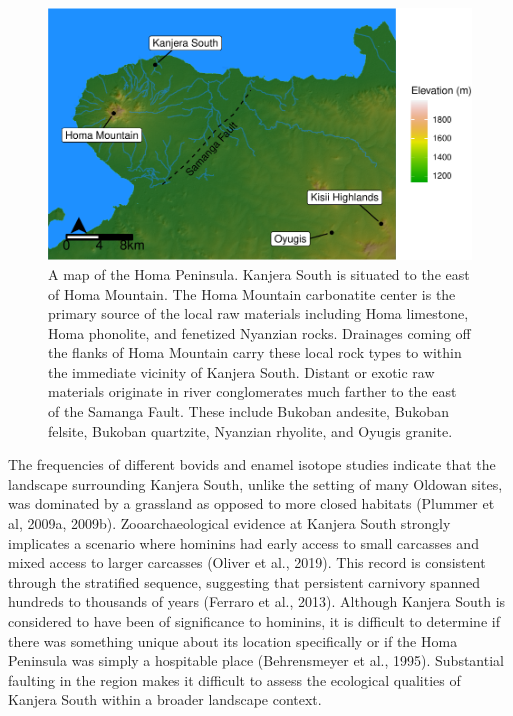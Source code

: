 \documentclass[]{elsarticle} %
\begin{document}
\begin{figure}
\centering
\includegraphics{Kanjera_South_Manuscript_files/figure-latex/fig-1-1.pdf}
\caption{A map of the Homa Peninsula. Kanjera South is situated to the
east of Homa Mountain. The Homa Mountain carbonatite center is the
primary source of the local raw materials including Homa limestone, Homa
phonolite, and fenetized Nyanzian rocks. Drainages coming off the flanks
of Homa Mountain carry these local rock types to within the immediate
vicinity of Kanjera South. Distant or exotic raw materials originate in
river conglomerates much farther to the east of the Samanga Fault. These
include Bukoban andesite, Bukoban felsite, Bukoban quartzite, Nyanzian
rhyolite, and Oyugis granite. \label{map}}
\end{figure}

The frequencies of different bovids and enamel isotope studies indicate
that the landscape surrounding Kanjera South, unlike the setting of many
Oldowan sites, was dominated by a grassland as opposed to more closed
habitats (\hspace{0pt}Plummer et al, 2009a\hspace{0pt},
\hspace{0pt}2009b\hspace{0pt}). Zooarchaeological evidence at Kanjera
South strongly implicates a scenario where hominins had early access to
small carcasses and mixed access to larger carcasses (\hspace{0pt}Oliver
et al., 2019\hspace{0pt}). This record is consistent through the
stratified sequence, suggesting that persistent carnivory spanned
hundreds to thousands of years (\hspace{0pt}Ferraro et al.,
2013\hspace{0pt}). Although Kanjera South is considered to have been of
significance to hominins, it is difficult to determine if there was
something unique about its location specifically or if the Homa
Peninsula was simply a hospitable place (\hspace{0pt}Behrensmeyer et
al., 1995\hspace{0pt}). Substantial faulting in the region makes it
difficult to assess the ecological qualities of Kanjera South within a
broader landscape context.
\end{document}
